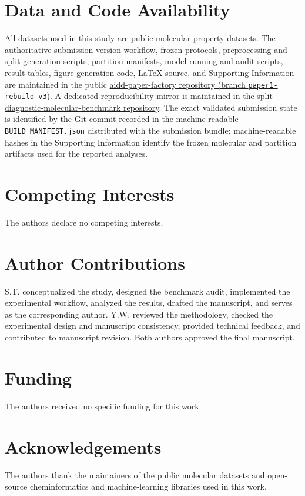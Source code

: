 \section*{Data and Code Availability}

All datasets used in this study are public molecular-property datasets. The authoritative submission-version workflow, frozen protocols, preprocessing and split-generation scripts, partition manifests, model-running and audit scripts, result tables, figure-generation code, LaTeX source, and Supporting Information are maintained in the public \href{https://github.com/DCarchimonde/aidd-paper-factory/tree/paper1-rebuild-v3}{aidd-paper-factory repository (branch \texttt{paper1-rebuild-v3})}. A dedicated reproducibility mirror is maintained in the \href{https://github.com/DCarchimonde/split-diagnostic-molecular-benchmark}{split-diagnostic-molecular-benchmark repository}. The exact validated submission state is identified by the Git commit recorded in the machine-readable \texttt{BUILD\_MANIFEST.json} distributed with the submission bundle; machine-readable hashes in the Supporting Information identify the frozen molecular and partition artifacts used for the reported analyses.

\section*{Competing Interests}

The authors declare no competing interests.

\section*{Author Contributions}

S.T. conceptualized the study, designed the benchmark audit, implemented the experimental workflow, analyzed the results, drafted the manuscript, and serves as the corresponding author. Y.W. reviewed the methodology, checked the experimental design and manuscript consistency, provided technical feedback, and contributed to manuscript revision. Both authors approved the final manuscript.

\section*{Funding}

The authors received no specific funding for this work.

\section*{Acknowledgements}

The authors thank the maintainers of the public molecular datasets and open-source cheminformatics and machine-learning libraries used in this work.
